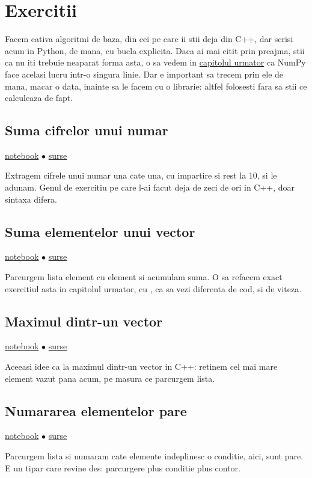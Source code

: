 \section{Exercitii}

Facem cativa algoritmi de baza, din cei pe care ii stii deja din C++, dar
scrisi acum in Python, de mana, cu bucla explicita. Daca ai mai citit prin
preajma, stii ca nu iti trebuie neaparat forma asta, o sa vedem in
\hyperref[chapter:numpy-pandas]{capitolul urmator} ca NumPy face acelasi
lucru intr-o singura linie. Dar e important sa trecem prin ele de mana,
macar o data, inainte sa le facem cu o librarie: altfel folosesti
 fara sa stii ce calculeaza de fapt.

\subsection{Suma cifrelor unui numar}
\label{problem:suma-cifrelor}

\href{notebooks/suma-cifrelor.ipynb}{notebook}
$\bullet$
\hyperref[code:suma-cifrelor]{surse}

Extragem cifrele unui numar una cate una, cu impartire si rest la 10, si
le adunam. Genul de exercitiu pe care l-ai facut deja de zeci de ori in
C++, doar sintaxa difera.

\subsection{Suma elementelor unui vector}
\label{problem:suma-vector}

\href{notebooks/suma-vector.ipynb}{notebook}
$\bullet$
\hyperref[code:suma-vector]{surse}

Parcurgem lista element cu element si acumulam suma. O sa refacem exact
exercitiul asta in capitolul urmator, cu , ca sa vezi
diferenta de cod, si de viteza.

\subsection{Maximul dintr-un vector}
\label{problem:maxim-vector}

\href{notebooks/maxim-vector.ipynb}{notebook}
$\bullet$
\hyperref[code:maxim-vector]{surse}

Aceeasi idee ca la maximul dintr-un vector in C++: retinem cel mai mare
element vazut pana acum, pe masura ce parcurgem lista.

\subsection{Numararea elementelor pare}
\label{problem:numarare-conditie}

\href{notebooks/numarare-conditie.ipynb}{notebook}
$\bullet$
\hyperref[code:numarare-conditie]{surse}

Parcurgem lista si numaram cate elemente indeplinesc o conditie, aici,
sunt pare. E un tipar care revine des: parcurgere plus conditie plus
contor.
